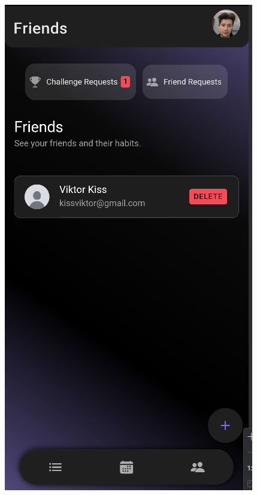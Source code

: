 \documentclass[12pt]{report}
\begin{document}
\begin{figure}[H]
    \begin{minipage}[b]{0.25\textwidth}
        \includegraphics[width=\linewidth]{src/challenge3.png}
    \end{minipage}
    \hfill
    \begin{minipage}[b]{0.25\textwidth}

\end{minipage}
\end{figure}
\end{document}
